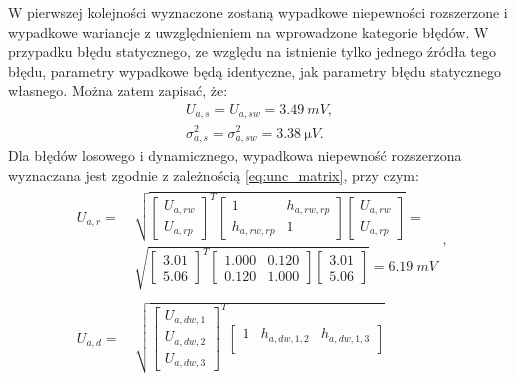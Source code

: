 W pierwszej kolejności wyznaczone zostaną wypadkowe niepewności rozszerzone i wypadkowe wariancje z uwzględnieniem na wprowadzone kategorie błędów. W przypadku błędu statycznego, ze względu na istnienie tylko jednego źródła tego błędu, parametry wypadkowe będą identyczne, jak parametry błędu statycznego własnego. Można zatem zapisać, że:
\begin{gather}
U_{a,s} = U_{a,sw} = \qty{3.49}{mV} \label{eq:sym_parta_uncert_stat}, \\
\sigma_{a,s}^{2} = \sigma_{a,sw}^{2} = \qty{3.38}{\micro V} \label{eq:sym_parta_var_stat}.
\end{gather}
Dla błędów losowego i dynamicznego, wypadkowa niepewność rozszerzona wyznaczana jest zgodnie z zależnością \eqref{eq:unc_matrix}, przy czym:
\begin{gather}
\begin{split}
U_{a,r} = ~
& \sqrt{
\begin{bmatrix}
U_{a,rw} \\ U_{a,rp}
\end{bmatrix}^{T}
\begin{bmatrix}
1           & h_{a,rw,rp} \\
h_{a,rw,rp} & 1
\end{bmatrix}
\begin{bmatrix}
U_{a,rw} \\ U_{a,rp}
\end{bmatrix}} = ~ \\
& \sqrt{
\begin{bmatrix}
3.01 \\ 5.06
\end{bmatrix}^{T}
\begin{bmatrix}
1.000 & 0.120 \\
0.120 & 1.000
\end{bmatrix}
\begin{bmatrix}
3.01 \\ 5.06
\end{bmatrix}} = \qty{6.19}{mV}
\end{split}
\label{eq:sym_parta_uncert_rand}, \\
\begin{split}
U_{a,d} = ~
& \sqrt{
\begin{bmatrix}
U_{a,dw,1} \\ U_{a,dw,2} \\ U_{a,dw,3}
\end{bmatrix}^{T}
\begin{bmatrix}
1            & h_{a,dw,1,2} & h_{a,dw,1,3} \\

\end{bmatrix}}
\end{split}
\end{gather}
